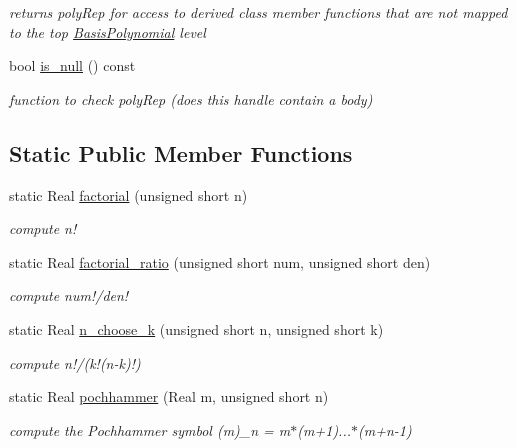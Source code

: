 \begin{DoxyCompactItemize}
\begin{DoxyCompactList}\small\item\em returns poly\+Rep for access to derived class member functions that are not mapped to the top \hyperlink{classPecos_1_1BasisPolynomial}{Basis\+Polynomial} level \end{DoxyCompactList}\item 
bool \hyperlink{classPecos_1_1BasisPolynomial_a3c45461717ff230edd665ce24da988c5}{is\+\_\+null} () const \label{classPecos_1_1BasisPolynomial_a3c45461717ff230edd665ce24da988c5}

\begin{DoxyCompactList}\small\item\em function to check poly\+Rep (does this handle contain a body) \end{DoxyCompactList}\end{DoxyCompactItemize}
\subsection*{Static Public Member Functions}
\begin{DoxyCompactItemize}
\item 
static Real \hyperlink{classPecos_1_1BasisPolynomial_a7faa05dcc03d3434fab2f7c6daea214c}{factorial} (unsigned short n)
\begin{DoxyCompactList}\small\item\em compute n! \end{DoxyCompactList}\item 
static Real \hyperlink{classPecos_1_1BasisPolynomial_a664cfe6495b3288d61da655623e1bc1b}{factorial\+\_\+ratio} (unsigned short num, unsigned short den)
\begin{DoxyCompactList}\small\item\em compute num!/den! \end{DoxyCompactList}\item 
static Real \hyperlink{classPecos_1_1BasisPolynomial_a7dd442a31465f57d8d60a7d8dc581376}{n\+\_\+choose\+\_\+k} (unsigned short n, unsigned short k)
\begin{DoxyCompactList}\small\item\em compute n!/(k!(n-\/k)!) \end{DoxyCompactList}\item 
static Real \hyperlink{classPecos_1_1BasisPolynomial_ad881b3d21f02cbe840663f1d57f717d4}{pochhammer} (Real m, unsigned short n)
\begin{DoxyCompactList}\small\item\em compute the Pochhammer symbol (m)\+\_\+n = m$\ast$(m+1)...$\ast$(m+n-\/1) \end{DoxyCompactList}\end{DoxyCompactItemize}
